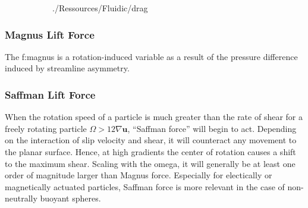 \begin{figure}
	\begin{subfigure}[!t]{0.39\textwidth}
		\centering
		\addtocounter{subfigure}{1}  
		 {./Ressources/Fluidic/drag}		
		\addtocounter{subfigure}{-1}  
		\label{fig:fluidic:drag}
	\end{subfigure}%
	\begin{subfigure}[!t]{0.39\textwidth}
		\centering
		\addtocounter{subfigure}{1}  
		\addtocounter{subfigure}{-1}  
		\label{fig:fluidic:lift1}
	\end{subfigure}%
	\begin{subfigure}[!t]{0.2\textwidth}
		\centering
		\addtocounter{subfigure}{1}  
		\addtocounter{subfigure}{-1}  
		\label{fig:fluidic:shear}
	\end{subfigure}
	\label{fig:fluidic:lift}
\end{figure}


\subsubsection{Magnus Lift Force}
The \gls{f:magnus} is a rotation-induced variable as a result of the pressure difference induced by streamline asymmetry. \cite{lit:fluidic:inertialFluidicsForces} 


\subsubsection{Saffman Lift Force}
When the rotation speed of a particle is much greater than the rate of shear for a freely rotating particle $\Omega>12\nabla\mathbf{u}$, ``Saffman force'' will begin to act. Depending on the interaction of slip velocity and shear, it will counteract any movement to the planar surface. Hence, at high gradients the center of rotation causes a shift to the maximum shear. \newline 
Scaling with the \gls{omega}, it will generally be at least one order of magnitude larger than Magnus force. Especially for electically or magnetically actuated particles, Saffman force is more relevant in the case of non-neutrally buoyant spheres.\cite{lit:fluidic:inertialFluidicsForces} 


